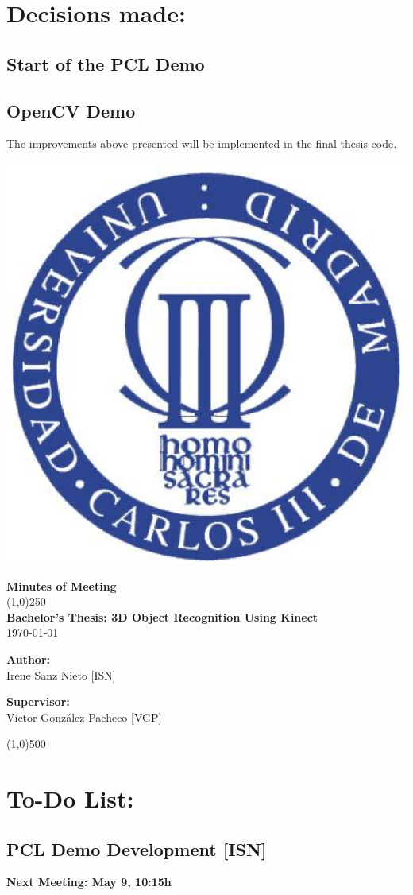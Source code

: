 \documentclass{article}
\newenvironment{myindentpar}[1]%
 {\begin{list}{}%
         {\setlength{\leftmargin}{#1}}%
         \item[]%
 }
 {\end{list}}
\begin{document}
\section{\LARGE Decisions made:}
	\subsection{Start of the PCL Demo}
	\subsection{OpenCV Demo}
		\begin{myindentpar}{1cm} 
		The improvements above presented will be implemented in the final thesis code. 
		\end{myindentpar}


\includegraphics[width=0.1\linewidth]{../template/uc3m.eps}

\vspace{-1cm}
\begin{minipage}[b]{1\linewidth}
	\begin{center}
	{\Huge \bfseries{Minutes of Meeting}}\\
	\line(1,0){250}\\[1cm]
	{\LARGE \textbf{Bachelor's Thesis: 3D Object Recognition Using Kinect}}\\[0.5cm]
	{\large \today}
	\end{center}
\end {minipage}



\begin{minipage}{0.55\textwidth}
\begin{flushleft} \large
\textbf{{Author:}\\}
Irene Sanz Nieto [ISN]\\
\end{flushleft}
\end{minipage}
\begin{minipage}{0.4\textwidth}
\begin{flushright} \large
\textbf{Supervisor: }\\
Victor González Pacheco [VGP]
\end{flushright}\end{minipage}

\begin{center}
\line(1,0){500}
\end{center}
\section{\LARGE To-Do List: }
	\subsection{PCL Demo Development [ISN]}
	

	


\begin {center}
{\Large \textbf{Next Meeting: May 9, 10:15h}}
\end{center}
\end{document}
